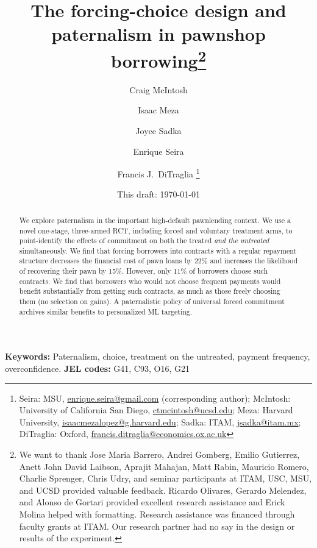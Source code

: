 \documentclass[12pt, a4paper]{article}
\begin{document}
\title{The forcing-choice design and paternalism in pawnshop borrowing\thanks{We want to thank Jose Maria Barrero, Andrei Gomberg, Emilio Gutierrez, Anett John David Laibson, Aprajit Mahajan, Matt Rabin, Mauricio Romero, Charlie Sprenger, Chris Udry, and seminar participants at ITAM, USC, MSU, and UCSD provided valuable feedback. Ricardo Olivares, Gerardo Melendez, and Alonso de Gortari provided excellent research assistance and Erick Molina helped with formatting.  Research assistance was financed through faculty grants at ITAM. Our research partner had no say in the design or results of the experiment.}}
\author{Craig McIntosh \and Isaac Meza \and Joyce Sadka \and Enrique Seira \and Francis J.\ DiTraglia   \thanks{Seira:  MSU, \url{enrique.seira@gmail.com} (corresponding author); McIntosh:  University of California San Diego, \url{ctmcintosh@ucsd.edu}; Meza: Harvard University, \url{isaacmezalopez@g.harvard.edu}; Sadka: ITAM, \url{jsadka@itam.mx}; DiTraglia: Oxford, \url{francis.ditraglia@economics.ox.ac.uk}} }
\date{This draft:  \today \\[2 cm]}



\maketitle
\vspace{-0.75in}

\begin{abstract}
We explore paternalism in the important high-default pawnlending context. We use a novel one-stage, three-armed RCT, including forced and voluntary treatment arms, to point-identify the effects of commitment on both the treated \textit{and the untreated} simultaneously. We find that forcing borrowers into contracts with a regular repayment structure decreases the financial cost of pawn loans by 22\% and increases the likelihood of recovering their pawn by 15\%. However, only 11\% of borrowers choose such contracts. We find that borrowers who would not choose frequent payments would benefit substantially from getting such contracts, as much as those freely choosing them (no selection on gains).  A paternalistic policy of universal forced commitment archives similar benefits to personalized ML targeting. 
\end{abstract}


\vspace{.8in}
\noindent \textbf{Keywords: } Paternalism, choice, treatment on the untreated, payment frequency, overconfidence. \textbf{JEL codes:} G41, C93, O16, G21
\end{document}
